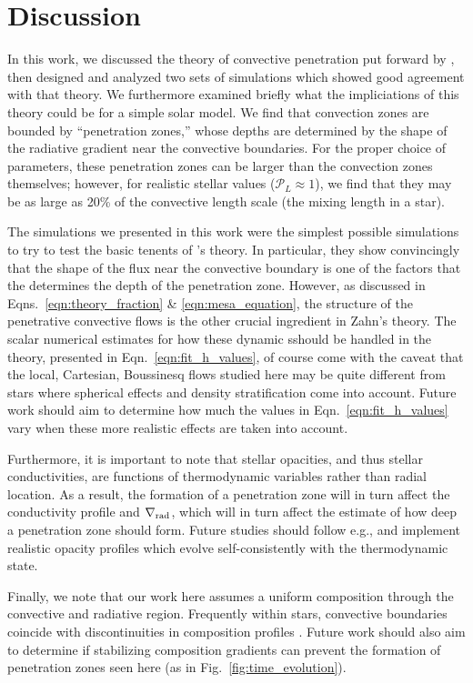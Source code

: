 \documentclass{aastex631}
\newcommand{\gradrad}{\ensuremath{\nabla_{\rm{rad}}}}
\newcommand{\mP}{\ensuremath{\mathcal{P}}}
\begin{document}
\section{Discussion}
\label{sec:discussion}
In this work, we discussed the theory of convective penetration put forward by \citet{zahn1991}, then designed and analyzed two sets of simulations which showed good agreement with that theory.
We furthermore examined briefly what the impliciations of this theory could be for a simple solar model.
We find that convection zones are bounded by ``penetration zones,'' whose depths are determined by the shape of the radiative gradient near the convective boundaries.
For the proper choice of parameters, these penetration zones can be larger than the convection zones themselves; however, for realistic stellar values ($\mP_L \approx 1$), we find that they may be as large as 20\% of the convective length scale (the mixing length in a star).

The simulations we presented in this work were the simplest possible simulations to try to test the basic tenents of \citet{zahn1991}'s theory.
In particular, they show convincingly that the shape of the flux near the convective boundary is one of the factors that the determines the depth of the penetration zone.
However, as discussed in Eqns.~\ref{eqn:theory_fraction} \& \ref{eqn:mesa_equation}, the structure of the penetrative convective flows is the other crucial ingredient in Zahn's theory.
The scalar numerical estimates for how these dynamic sshould be handled in the theory, presented in Eqn.~\ref{eqn:fit_h_values}, of course come with the caveat that the local, Cartesian, Boussinesq flows studied here may be quite different from stars where spherical effects and density stratification come into account.
Future work should aim to determine how much the values in Eqn.~\ref{eqn:fit_h_values} vary when these more realistic effects are taken into account.

Furthermore, it is important to note that stellar opacities, and thus stellar conductivities, are functions of thermodynamic variables rather than radial location.
As a result, the formation of a penetration zone will in turn affect the conductivity profile and $\gradrad$, which will in turn affect the estimate of how deep a penetration zone should form.
Future studies should follow e.g., \citet{kapyla_etal_2017, kapyla2019} and implement realistic opacity profiles which evolve self-consistently with the thermodynamic state.

Finally, we note that our work here assumes a uniform composition through the convective and radiative region.
Frequently within stars, convective boundaries coincide with discontinuities in composition profiles \citep{salaris_cassisi_2017}.
Future work should also aim to determine if stabilizing composition gradients can prevent the formation of penetration zones seen here (as in Fig.~\ref{fig:time_evolution}).
\end{document}

